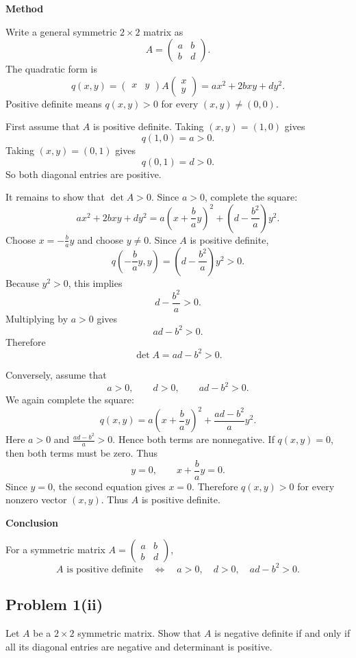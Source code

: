\documentclass[11pt]{article}
\newenvironment{methodbox}[1]{\par\medskip\noindent\textcolor{lineblue}{\textbf{#1}}\par\smallskip}{\par\medskip}
\newenvironment{answerbox}[1]{\par\medskip\noindent\textcolor{linegreen}{\textbf{#1}}\par\smallskip}{\par\medskip}
\begin{document}
\begin{methodbox}{Method}
Write a general symmetric $2\times 2$ matrix as
\[
A=\begin{pmatrix}a&b\\ b&d\end{pmatrix}.
\]
The quadratic form is
\[
q(x,y)=\begin{pmatrix}x&y\end{pmatrix}A\begin{pmatrix}x\\y\end{pmatrix}=ax^2+2bxy+dy^2.
\]
Positive definite means $q(x,y)>0$ for every $(x,y)\neq(0,0)$.
\end{methodbox}

First assume that $A$ is positive definite.  Taking $(x,y)=(1,0)$ gives
\[
q(1,0)=a>0.
\]
Taking $(x,y)=(0,1)$ gives
\[
q(0,1)=d>0.
\]
So both diagonal entries are positive.

It remains to show that $\det A>0$. Since $a>0$, complete the square:
\[
ax^2+2bxy+dy^2
=a\left(x+\frac{b}{a}y\right)^2+\left(d-\frac{b^2}{a}\right)y^2.
\]
Choose $x=-\frac{b}{a}y$ and choose $y\neq0$.  Since $A$ is positive definite,
\[
q\left(-\frac{b}{a}y,y\right)=\left(d-\frac{b^2}{a}\right)y^2>0.
\]
Because $y^2>0$, this implies
\[
d-\frac{b^2}{a}>0.
\]
Multiplying by $a>0$ gives
\[
ad-b^2>0.
\]
Therefore
\[
\det A=ad-b^2>0.
\]

Conversely, assume that
\[
a>0,\qquad d>0,\qquad ad-b^2>0.
\]
We again complete the square:
\[
q(x,y)=a\left(x+\frac{b}{a}y\right)^2+\frac{ad-b^2}{a}y^2.
\]
Here $a>0$ and $\frac{ad-b^2}{a}>0$. Hence both terms are nonnegative. If $q(x,y)=0$, then both terms must be zero. Thus
\[
y=0,
\qquad x+\frac{b}{a}y=0.
\]
Since $y=0$, the second equation gives $x=0$. Therefore $q(x,y)>0$ for every nonzero vector $(x,y)$. Thus $A$ is positive definite.

\begin{answerbox}{Conclusion}
For a symmetric matrix $A=\begin{pmatrix}a&b\\b&d\end{pmatrix}$,
\[
A\text{ is positive definite}\quad\Longleftrightarrow\quad a>0,
\quad d>0,
\quad ad-b^2>0.
\]
\end{answerbox}

\subsection*{Problem 1(ii)}
Let $A$ be a $2\times 2$ symmetric matrix. Show that $A$ is negative definite if and only if all its diagonal entries are negative and determinant is positive.
\end{document}
